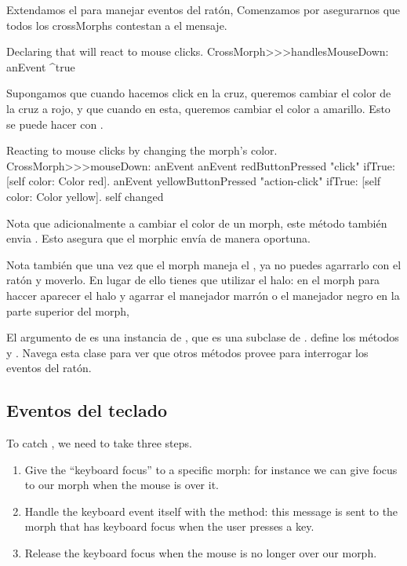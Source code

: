 \documentclass[a4paper,10pt,twoside]{book}
\begin{document}
Extendamos el  para manejar eventos del rat\'on, 
Comenzamos por asegurarnos que todos los crossMorphs contestan  a el mensaje. 

\begin{method}{Declaring that  will react to mouse clicks.}
CrossMorph>>>handlesMouseDown: anEvent
	^true
\end{method}

Supongamos que cuando hacemos click en la cruz, queremos cambiar el color de la cruz a rojo, y que cuando \actclick en esta, queremos cambiar el color a amarillo.
Esto se puede hacer con .

\begin{method}[mouseDown]{Reacting to mouse clicks by changing the morph's color.}
CrossMorph>>>mouseDown: anEvent
	anEvent redButtonPressed "click"
		ifTrue: [self color: Color red].
	anEvent yellowButtonPressed "action-click"
		ifTrue: [self color: Color yellow].
	self changed
\end{method}

Nota que adicionalmente a cambiar el color de un morph, este m\'etodo tambi\'en envia .
Esto asegura que el morphic env\'ia  de manera oportuna.

Nota tambi\'en que una vez que el morph maneja el , ya no puedes agarrarlo con el rat\'on y moverlo.
En lugar de ello tienes que utilizar el halo: \metaclick en el morph para haccer aparecer el halo y agarrar el manejador marr\'on \moveHandle{}  o el manejador negro \grabHandle{} en la parte superior del morph,

El argumento  de  es una instancia de \mbox{,} que es una subclase de  .  define los m\'etodos  y . Navega esta clase para ver que otros m\'etodos provee para interrogar los eventos del rat\'on.

\subsection{Eventos del teclado}

To catch , we need to take three steps.
\begin{enumerate}
	\item Give the ``keyboard focus'' to a specific morph: for instance we can give focus to our morph when the mouse is over it.
	\item Handle the keyboard event itself with the  method: this message is sent to the morph that has keyboard focus when the user presses a key.
	\item Release the keyboard focus when the mouse is no longer over our morph.
\end{enumerate}
\end{document}
